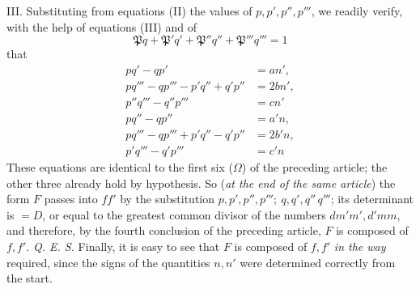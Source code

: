 III. Substituting from equations (II) the values of $p,p',p'',p'''$, we readily verify, with the help of equations (III) and of
\[
\mathfrak{P}q+\mathfrak{P}'q'+\mathfrak{P}''q''+\mathfrak{P}'''q'''=1
\]
that
\[
\begin{aligned}
pq'-qp'&=an',\\ pq'''-qp'''-p'q''+q'p''&=2bn',\\p''q'''-q''p'''&=cn'\\
pq''-qp''&=a'n,\\ pq'''-qp'''+p'q''-q'p''&=2b'n,\\p'q'''-q'p'''&=c'n
\end{aligned}
\]
These equations are identical to the first six ($\Omega$) of the preceding article; the other three already hold by hypothesis. So (\textit{at the end of the same article}) the form $F$ passes into $ff'$ by the substitution $p,p',p'',p''';\ q,q',q''\,q'''$; its determinant is $=D$, or equal to the greatest common divisor of the numbers $dm'm',d'mm$, and therefore, by the fourth conclusion of the preceding article, $F$ is composed of $f,f'$. \textit{Q. E. S.} Finally, it is easy to see that $F$ is composed of $f,f'$ \textit{in the way} required, since the signs of the quantities $n,n'$ were determined correctly from the start.

